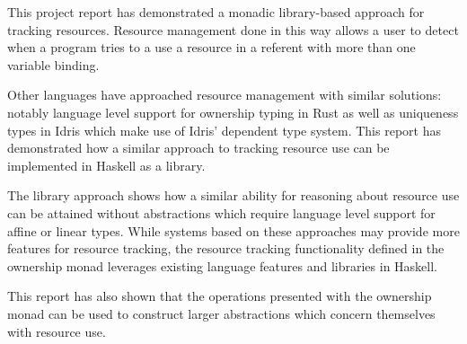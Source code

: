 \documentclass[onehalf,11pt]{beavtex}
\begin{document}
This project report has demonstrated a monadic library-based approach for
tracking resources.
Resource management done in this way allows a user to detect when a program
tries to a use a resource in a referent with more than one variable binding.

Other languages have approached resource management with similar
solutions: notably language level support for ownership typing in Rust as well
as uniqueness types in Idris which make use of Idris' dependent type system.
This report has demonstrated how a similar approach to tracking resource use can be
implemented in Haskell as a library.

The library approach shows how a similar ability for reasoning about resource use
can be attained without abstractions which require language level support for
affine or linear types.
While systems based on these approaches may provide more features for resource
tracking, the resource tracking functionality defined in the ownership
monad leverages existing language features and libraries in Haskell.

This report has also shown that the operations presented with the ownership monad
can be used to construct larger abstractions which concern themselves with
resource use.


{}

\end{document}
